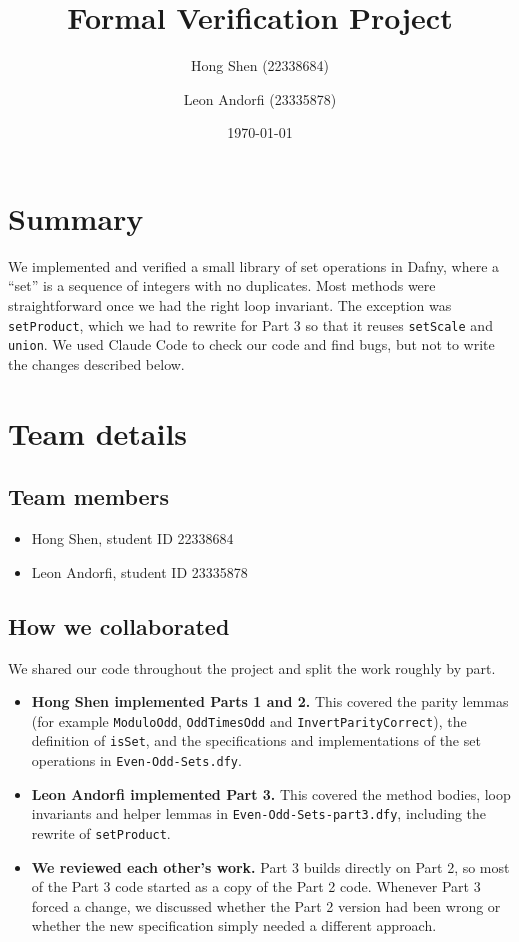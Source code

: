 \documentclass[11pt,a4paper]{article}
\title{Formal Verification Project}
\author{Hong Shen (22338684) \and Leon Andorfi (23335878)}
\date{\today}
\begin{document}
\maketitle

\section*{Summary}

We implemented and verified a small library of set operations in Dafny, where a ``set'' is a sequence of integers with no duplicates. Most methods were straightforward once we had the right loop invariant. The exception was \texttt{setProduct}, which we had to rewrite for Part 3 so that it reuses \texttt{setScale} and \texttt{union}. We used Claude Code to check our code and find bugs, but not to write the changes described below.

\section{Team details}

\subsection{Team members}

\begin{itemize}
  \item Hong Shen, student ID 22338684
  \item Leon Andorfi, student ID 23335878
\end{itemize}

\subsection{How we collaborated}

We shared our code throughout the project and split the work roughly by part.

\begin{itemize}
  \item \textbf{Hong Shen implemented Parts 1 and 2.} This covered the parity lemmas (for example \texttt{ModuloOdd}, \texttt{OddTimesOdd} and \texttt{InvertParityCorrect}), the definition of \texttt{isSet}, and the specifications and implementations of the set operations in \texttt{Even-Odd-Sets.dfy}.
  \item \textbf{Leon Andorfi implemented Part 3.} This covered the method bodies, loop invariants and helper lemmas in \texttt{Even-Odd-Sets-part3.dfy}, including the rewrite of \texttt{setProduct}.
  \item \textbf{We reviewed each other's work.} Part 3 builds directly on Part 2, so most of the Part 3 code started as a copy of the Part 2 code. Whenever Part 3 forced a change, we discussed whether the Part 2 version had been wrong or whether the new specification simply needed a different approach.
\end{itemize}
\end{document}

